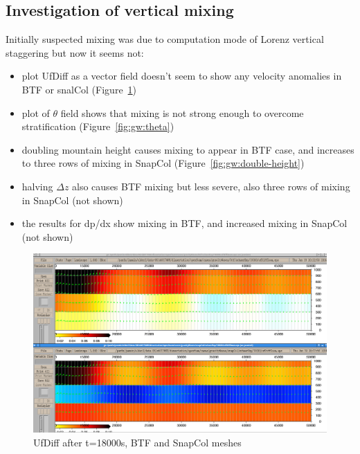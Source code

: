 \subsection{Investigation of vertical mixing}
Initially suspected mixing was due to computation mode of Lorenz vertical staggering but now it seems not:
\begin{itemize}
	\item plot UfDiff as a vector field doesn't seem to show any velocity anomalies in BTF or snalCol (Figure~\ref{fig:gw:ufdiff})
	\item plot of $\theta$ field shows that mixing is not strong enough to overcome stratification (Figure~\ref{fig:gw:theta})
	\item doubling mountain height causes mixing to appear in BTF case, and increases to three rows of mixing in SnapCol (Figure~\ref{fig:gw:double-height})
	\item halving $\Delta z$ also causes BTF mixing but less severe, also three rows of mixing in SnapCol (not shown)
	\item the results for dp/dx show mixing in BTF, and increased mixing in SnapCol (not shown)
\end{itemize}

\begin{figure}
	\includegraphics[width=\textwidth]{interim-results/gravityWavesBTFSnapColVelocityVectors.png}
	\caption{UfDiff after t=18000s, BTF and SnapCol meshes}
	\label{fig:gw:ufdiff}
\end{figure}

